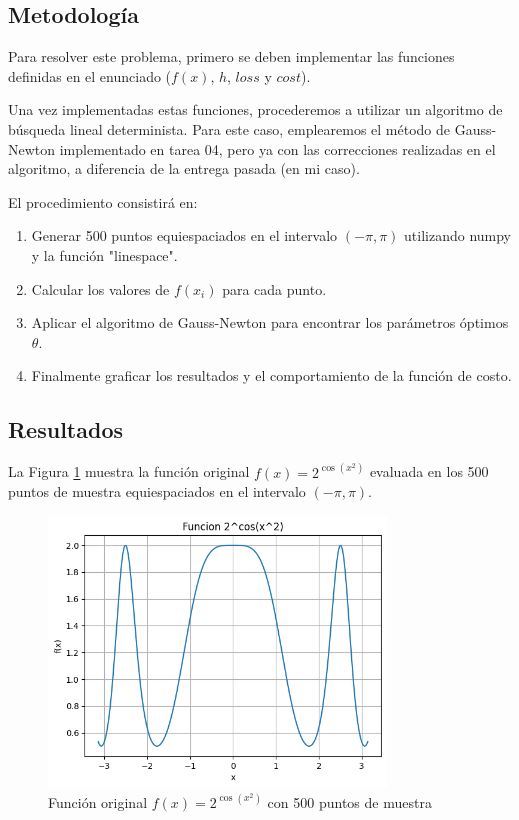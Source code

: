 \documentclass{article}
\begin{document}
\subsection{Metodología}

Para resolver este problema, primero se deben implementar las funciones definidas en el enunciado ($f(x)$, $h$, $loss$ y $cost$).

Una vez implementadas estas funciones, procederemos a utilizar un algoritmo de búsqueda lineal determinista. Para este caso, emplearemos el método de Gauss-Newton implementado en tarea 04, pero ya con las correcciones realizadas en el algoritmo, a diferencia de la entrega pasada (en mi caso).

El procedimiento consistirá en:
\begin{enumerate}
    \item Generar 500 puntos equiespaciados en el intervalo $(-\pi, \pi)$ utilizando numpy y la función "linespace".
    \item Calcular los valores de $f(x_i)$ para cada punto.
    \item Aplicar el algoritmo de Gauss-Newton para encontrar los parámetros óptimos $\theta$.
    \item Finalmente graficar los resultados y el comportamiento de la función de costo.
\end{enumerate}

\subsection{Resultados}
\setcounter{equation}{0}

La Figura \ref{fig:fx} muestra la función original $f(x) = 2^{\cos(x^2)}$ evaluada en los 500 puntos de muestra equiespaciados en el intervalo $(-\pi, \pi)$.

\begin{figure}[H]
    \centering
    \includegraphics[width=0.8\textwidth]{images/1_fx.png}
    \caption{Función original $f(x) = 2^{\cos(x^2)}$ con 500 puntos de muestra}
    \label{fig:fx}
\end{figure}
\end{document}
